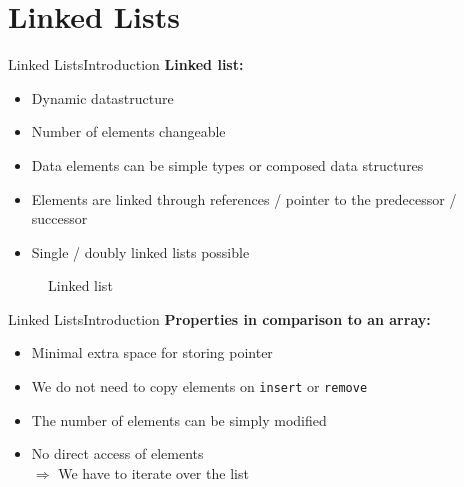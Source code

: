 \section{Linked Lists}

\begin{frame}{Linked Lists}{Introduction}
  \textbf{Linked list:}
  \begin{itemize}
    \item<2->
      Dynamic datastructure
    \item<3->
      Number of elements changeable
    \item<4->
      Data elements can be simple types or composed data structures
    \item<5->
      {\color{MainA}Elements are linked} through references / pointer
      to the predecessor / successor
    \item<6->
      Single / doubly linked lists possible
  \end{itemize}
  \begin{figure}
    
    \caption{Linked list}
    \label{fig:linked_list:singly_linked_list}
  \end{figure}
\end{frame}


\begin{frame}{Linked Lists}{Introduction}
  \textbf{Properties in comparison to an array:}
  \begin{itemize}
    \item<2->
      Minimal extra space for storing pointer
    \item<3->
      We do not need to copy elements on {\color{Mittel-Blau}\texttt{insert}}
      or {\color{Mittel-Blau}\texttt{remove}}
    \item<4->
      The number of elements can be simply modified 
    \item<5->
      No direct access of elements\\
      $\Rightarrow$ We have to iterate over the list
  \end{itemize}
\end{frame}


